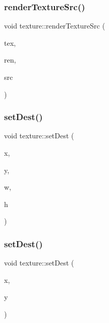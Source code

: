 \mbox{\label{classtexture_abda16deb5c6c4b90c0e8bcc8a04d8460}} 
\subsubsection{\texorpdfstring{render\+Texture\+Src()}{renderTextureSrc()}}
{\footnotesize\ttfamily void texture\+::render\+Texture\+Src (\begin{DoxyParamCaption}\item[{S\+D\+L\+\_\+\+Texture $\ast$}]{tex,  }\item[{S\+D\+L\+\_\+\+Renderer $\ast$}]{ren,  }\item[{S\+D\+L\+\_\+\+Rect}]{src }\end{DoxyParamCaption})}

\mbox{\label{classtexture_a54c6238b24c50e9da0c51c068b3381b2}} 
\subsubsection{\texorpdfstring{set\+Dest()}{setDest()}\hspace{0.1cm}{\footnotesize\ttfamily [1/3]}}
{\footnotesize\ttfamily void texture\+::set\+Dest (\begin{DoxyParamCaption}\item[{float}]{x,  }\item[{float}]{y,  }\item[{float}]{w,  }\item[{float}]{h }\end{DoxyParamCaption})}

\mbox{\label{classtexture_a7df432f0c64c23ed275355ccbf2e4a85}} 
\subsubsection{\texorpdfstring{set\+Dest()}{setDest()}\hspace{0.1cm}{\footnotesize\ttfamily [2/3]}}
{\footnotesize\ttfamily void texture\+::set\+Dest (\begin{DoxyParamCaption}\item[{float}]{x,  }\item[{float}]{y }\end{DoxyParamCaption})}

